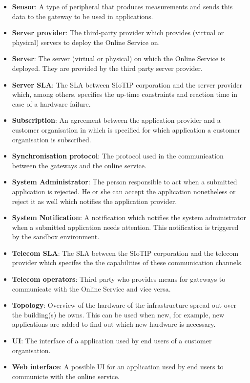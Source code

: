 \documentclass[english,peerreview]{sareport}
\begin{document}
\begin{itemize}
	\item \textbf{Sensor}: A type of peripheral that produces measurements and sends this data to the gateway to be used in applications.
	\item \textbf{Server provider}: The third-party provider which provides (virtual or physical) servers to deploy the Online Service on.
	\item \textbf{Server}: The server (virtual or physical) on which the Online Service is deployed. They are provided by the third party server provider.
	\item \textbf{Server SLA}: The SLA between SIoTIP corporation and the server provider which, among others, specifies the up-time constraints and reaction time in case of a hardware failure.
	\item \textbf{Subscription}: An agreement between the application provider and a customer organisation in which is specified for which application a customer organisation is subscribed.
	\item \textbf{Synchronisation protocol}: The protocol used in the communication between the gateways and the online service.
	\item \textbf{System Administrator}: The person responsible to act when a submitted application is rejected. He or she can accept the application nonetheless or reject it as well which notifies the application provider.
	\item \textbf{System Notification}: A notification which notifies the system administrator when a submitted application needs attention. This notification is triggered by the sandbox environment.
	\item \textbf{Telecom SLA}: The SLA between the SIoTIP corporation and the telecom provider which specifes the the capabilities of these communication channels.
	\item \textbf{Telecom operators}: Third party who provides means for gateways to communicate with the Online Service and vice versa.
	\item \textbf{Topology}: Overview of the hardware of the infrastructure spread out over the building(s) he owns. This can be used when new, for example, new applications are added to find out which new hardware is necessary.
	\item \textbf{UI}: The interface of a application used by end users of a customer organisation.
	\item \textbf{Web interface}: A possible UI for an application used by end users to communicte with the online service.
\end{itemize}
\end{document}
